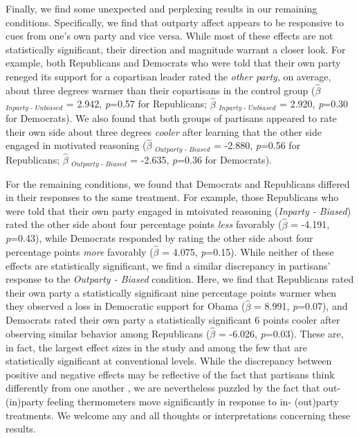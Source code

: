 \documentclass[12pt, letterpaper]{article}
\begin{document}
Finally, we find some unexpected and perplexing results in our remaining conditions. Specifically, we find that outparty affect appears to be responsive to cues from one's own party and vice versa. While most of these effects are not statistically significant, their direction and magnitude warrant a closer look. For example, both Republicans and Democrats who were told that their own party reneged its support for a copartisan leader rated the \textit{other party}, on average, about three degrees warmer than their copartisans in the control group ($\hat{\beta}$ $_{\textit{Inparty - Unbiased}}$ = 2.942, \textit{p}=0.57 for Republicans; $\hat{\beta}$ $_{\textit{Inparty - Unbiased}}$ = 2.920, \textit{p}=0.30 for Democrats). We also found that both groups of partisans appeared to rate their own side about three degrees \textit{cooler} after learning that the other side engaged in motivated reasoning ($\hat{\beta}$ $_{\textit{Outparty - Biased}}$ = -2.880, \textit{p}=0.56 for Republicans; $\hat{\beta}$ $_{\textit{Outparty - Biased}}$ = -2.635, \textit{p}=0.36 for Democrats). 

For the remaining conditions, we found that Democrats and Republicans differed in their responses to the same treatment. For example, those Republicans who were told that their own party engaged in mtoivated reasoning  (\textit{Inparty - Biased}) rated the other side about four percentage points \textit{less} favorably ($\hat{\beta}$ = -4.191, \textit{p}=0.43), while Democrats responded by rating the other side about four percentage points \textit{more} favorably ($\hat{\beta}$ = 4.075, \textit{p}=0.15). While neither of these effects are statistically significant, we find a similar discrepancy in partisans' response to the \textit{Outparty - Biased} condition. Here, we find that Republicans rated their own party a statistically significant nine percentage points warmer when they observed a loss in Democratic support for Obama ($\hat{\beta}$ = 8.991, \textit{p}=0.07), and Democrats rated their own party a statistically significant 6 points cooler after observing similar behavior among Republicans ($\hat{\beta}$ = -6.026, \textit{p}=0.03). These are, in fact, the largest effect sizes in the study and among the few that are statistically significant at conventional levels. While the discrepancy between positive and negative effects may be reflective of the fact that partisans think differently from one another \citep{grossmanhopkins_2016}, we are nevertheless puzzled by the fact that out- (in)party feeling thermometers move significantly in response to in- (out)party treatments. We welcome any and all thoughts or interpretations concerning these results. 
\end{document}
